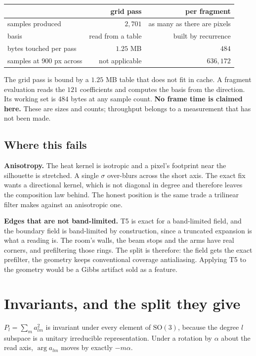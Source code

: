 \begin{center}
\begin{tabular}{@{}lrr@{}}
\toprule
 & grid pass & per fragment \\
\midrule
samples produced & \(2{,}701\) & as many as there are pixels \\
basis & read from a table & built by recurrence \\
bytes touched per pass & \(1.25\) MB & \(484\) \\
samples at 900 px across & not applicable & \(636{,}172\) \\
\bottomrule
\end{tabular}
\end{center}

The grid pass is bound by a \(1.25\) MB table that does not fit in cache. A fragment evaluation reads the \(121\) coefficients and computes the basis from the direction. Its working set is \(484\) bytes at any sample count. \textbf{No frame time is claimed here.} These are sizes and counts; throughput belongs to a measurement that has not been made.

\subsection{Where this fails}

\textbf{Anisotropy.} The heat kernel is isotropic and a pixel's footprint near the silhouette is stretched. A single \(\sigma\) over-blurs across the short axis. The exact fix wants a directional kernel, which is not diagonal in degree and therefore leaves the composition law behind. The honest position is the same trade a trilinear filter makes against an anisotropic one.

\textbf{Edges that are not band-limited.} T5 is exact for a band-limited field, and the boundary field is band-limited by construction, since a truncated expansion is what a reading is. The room's walls, the beam stops and the arms have real corners, and prefiltering those rings. The split is therefore: the field gets the exact prefilter, the geometry keeps conventional coverage antialiasing. Applying T5 to the geometry would be a Gibbs artifact sold as a feature.

\section{Invariants, and the split they give}

\(P_l = \sum_m a_{lm}^2\) is invariant under every element of \(\mathrm{SO}(3)\), because the degree \(l\) subspace is a unitary irreducible representation. Under a rotation by \(\alpha\) about the read axis, \(\arg a_{lm}\) moves by exactly \(-m\alpha\).

